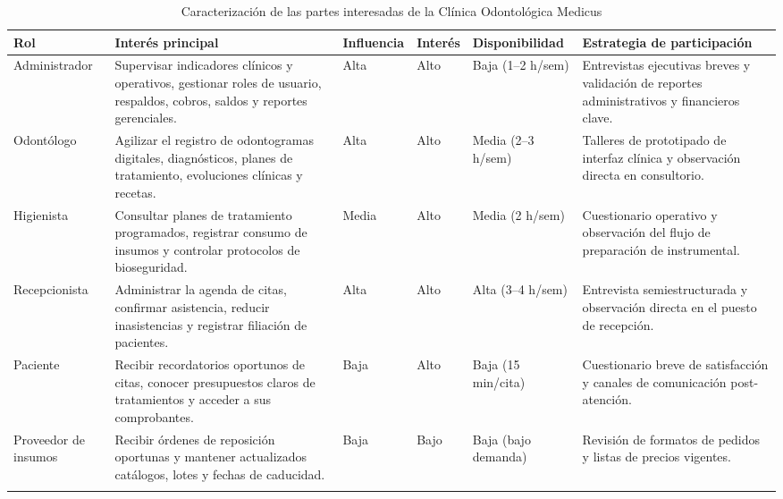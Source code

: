 \begin{table}[htbp]
\centering
\caption{Caracterización de las partes interesadas de la Clínica Odontológica Medicus}
\label{tab:partes_interesadas}
\begingroup
\scriptsize
\setlength{\tabcolsep}{3pt}
\renewcommand{\arraystretch}{1.18}
\begin{tabularx}{\textwidth}{
>{\raggedright\arraybackslash}p{1.65cm}
>{\raggedright\arraybackslash}X
>{\centering\arraybackslash}p{0.95cm}
>{\centering\arraybackslash}p{0.75cm}
>{\raggedright\arraybackslash}p{1.35cm}
>{\raggedright\arraybackslash}X}
\toprule
\textbf{Rol} & \textbf{Interés principal} & \textbf{Influencia} &
\textbf{Interés} & \textbf{Disponibilidad} &
\textbf{Estrategia de participación}\\
\midrule
Administrador &
Supervisar indicadores clínicos y operativos, gestionar roles de usuario, respaldos, cobros, saldos y reportes gerenciales. &
Alta & Alto & Baja (1--2 h/sem) &
Entrevistas ejecutivas breves y validación de reportes administrativos y financieros clave.\\
\addlinespace

Odontólogo &
Agilizar el registro de odontogramas digitales, diagnósticos, planes de tratamiento, evoluciones clínicas y recetas. &
Alta & Alto & Media (2--3 h/sem) &
Talleres de prototipado de interfaz clínica y observación directa en consultorio.\\
\addlinespace

Higienista &
Consultar planes de tratamiento programados, registrar consumo de insumos y controlar protocolos de bioseguridad. &
Media & Alto & Media (2 h/sem) &
Cuestionario operativo y observación del flujo de preparación de instrumental.\\
\addlinespace

Recepcionista &
Administrar la agenda de citas, confirmar asistencia, reducir inasistencias y registrar filiación de pacientes. &
Alta & Alto & Alta (3--4 h/sem) &
Entrevista semiestructurada y observación directa en el puesto de recepción.\\
\addlinespace

Paciente &
Recibir recordatorios oportunos de citas, conocer presupuestos claros de tratamientos y acceder a sus comprobantes. &
Baja & Alto & Baja (15 min/cita) &
Cuestionario breve de satisfacción y canales de comunicación post-atención.\\
\addlinespace

Proveedor de insumos &
Recibir órdenes de reposición oportunas y mantener actualizados catálogos, lotes y fechas de caducidad. &
Baja & Bajo & Baja (bajo demanda) &
Revisión de formatos de pedidos y listas de precios vigentes.\\
\addlinespace


\end{tabularx}
\end{table}
